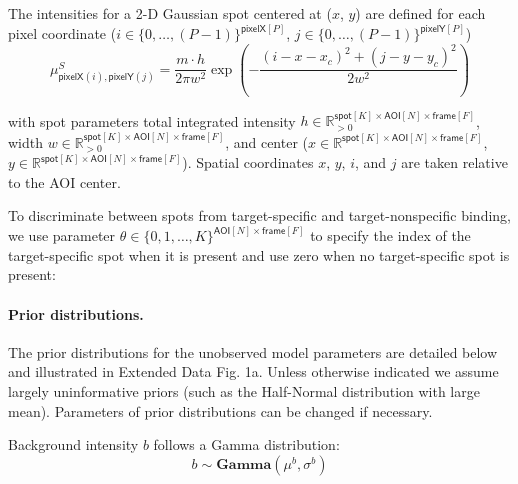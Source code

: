 The intensities for a 2-D Gaussian spot centered at ($x$, $y$) are defined for each pixel coordinate ($i \in \{0, \dots, (P-1)\}^{\mathsf{pixelX}[P]}$, $j \in \{0, \dots, (P-1)\}^{\mathsf{pixelY}[P]}$)
%
\begin{equation}
    \mu^S_{\mathsf{pixelX}(i), \mathsf{pixelY}(j)} = \dfrac{m \cdot h}{2 \pi w^2} \exp{\left( -\dfrac{(i-x-x_c)^2 + (j-y-y_c)^2}{2 w^2} \right)}
\end{equation}

\noindent
with spot parameters total integrated intensity $h \in \mathbb{R}_{>0}^{\mathsf{spot}[K] \times \mathsf{AOI}[N] \times \mathsf{frame}[F]}$, width $w \in \mathbb{R}_{>0}^{\mathsf{spot}[K] \times \mathsf{AOI}[N] \times \mathsf{frame}[F]}$, and center ($x \in \mathbb{R}^{\mathsf{spot}[K] \times \mathsf{AOI}[N] \times \mathsf{frame}[F]}$, $y \in \mathbb{R}^{\mathsf{spot}[K] \times \mathsf{AOI}[N] \times \mathsf{frame}[F]}$). Spatial coordinates $x$, $y$, $i$, and $j$ are taken relative to the AOI center. 
%

To discriminate between spots from target-specific and target-nonspecific binding, we use parameter $\theta \in \{ 0, 1, \dots, K \}^{ \mathsf{AOI}[N] \times \mathsf{frame}[F]}$ to specify the index of the target-specific spot when it is present and use zero when no target-specific spot is present:
%

\paragraph{Prior distributions.} The prior distributions for the unobserved model parameters are detailed below and illustrated in Extended Data Fig. 1a. Unless otherwise indicated we assume largely uninformative priors (such as the Half-Normal distribution with large mean). Parameters of prior distributions can be changed if necessary.

Background intensity $b$ follows a Gamma distribution:
%
\begin{equation}
    b \sim \mathbf{Gamma}(\mu^b, \sigma^b)
\end{equation}

